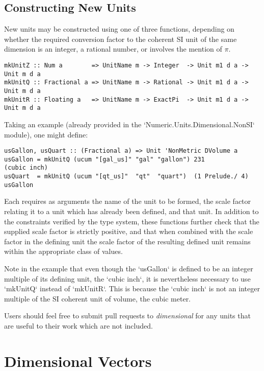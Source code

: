 \documentclass[11pt]{report}
\newcommand{\packagename}[1]{\textit{#1}}
\newcommand{\thispackage}{\packagename{dimensional}}
\begin{document}
\section{Constructing New Units} \label{constructing-new-units}

New units may be constructed using one of three functions, depending on whether the required conversion factor to the coherent
SI unit of the same dimension is an integer, a rational number, or involves the mention of $ \pi $.

\begin{lstlisting}
mkUnitZ :: Num a        => UnitName m -> Integer  -> Unit m1 d a -> Unit m d a
mkUnitQ :: Fractional a => UnitName m -> Rational -> Unit m1 d a -> Unit m d a
mkUnitR :: Floating a   => UnitName m -> ExactPi  -> Unit m1 d a -> Unit m d a
\end{lstlisting}

Taking an example (already provided in the `Numeric.Units.Dimensional.NonSI` module), one might define:

\begin{lstlisting}
usGallon, usQuart :: (Fractional a) => Unit 'NonMetric DVolume a
usGallon = mkUnitQ (ucum "[gal_us]" "gal" "gallon") 231             (cubic inch)
usQuart  = mkUnitQ (ucum "[qt_us]"  "qt"  "quart")  (1 Prelude./ 4) usGallon
\end{lstlisting}

Each requires as arguments the name of the unit to be formed, the scale factor relating it to a unit which has already been defined,
and that unit. In addition to the constraints verified by the type system, these functions further check that the supplied scale factor is
strictly positive, and that when combined with the scale factor in the defining unit the scale factor of the resulting defined unit remains
within the appropriate class of values.

Note in the example that even though the `usGallon` is defined to be an integer multiple of its defining unit, the `cubic inch`, it is nevertheless
necessary to use `mkUnitQ` instead of `mkUnitR`. This is because the `cubic inch` is not an integer multiple of the SI coherent unit of volume, the cubic meter.

Users should feel free to submit pull requests to \thispackage{} for any units that are useful to their work which are not included.




\chapter{Dimensional Vectors}
\end{document}
